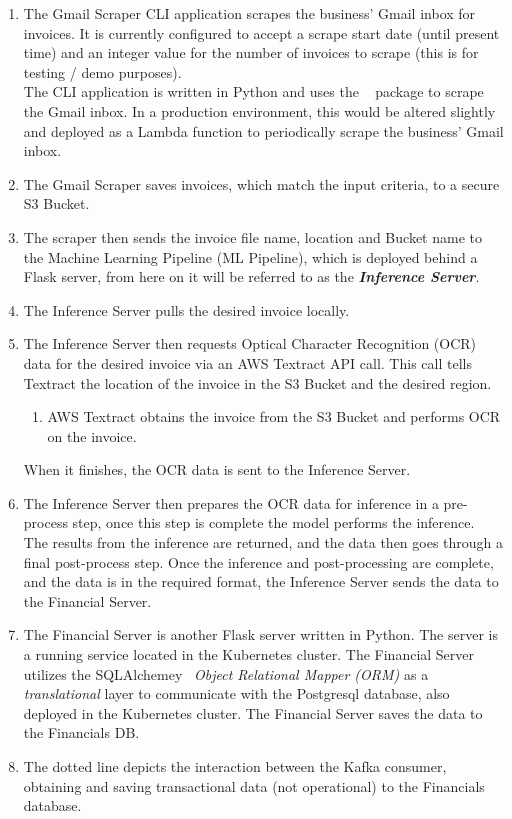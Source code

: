 \begin{enumerate} \label{enumerate:architecture}
	\item The Gmail Scraper CLI application scrapes the business' Gmail inbox for invoices.
	      It is currently configured to accept a scrape start date (until present time) and an
	      integer value for the number of invoices to scrape (this is for testing / demo purposes). \\
	      The CLI application is written in Python and uses the ~\autocite{rusevImboxPythonIMAP} package to scrape the
	      Gmail inbox.
	      \bigbreak
	      In a production environment, this would be altered slightly and deployed as a Lambda function
	      to periodically scrape the business' Gmail inbox.
	\item The Gmail Scraper saves invoices, which match the input criteria, to a secure S3 Bucket.
	\item The scraper then sends the invoice file name, location and Bucket name to the Machine Learning Pipeline (ML Pipeline),
	      which is deployed behind a Flask server, from here on it will be referred to as the \emph{\textbf{Inference Server}}.
	\item The Inference Server pulls the desired invoice locally.
	\item The Inference Server then requests Optical Character Recognition (OCR) data for the desired invoice via an AWS Textract API call.
	      This call tells Textract the location of the invoice in the S3 Bucket and the desired region.
	      \begin{enumerate}
		      \item AWS Textract obtains the invoice from the S3 Bucket and performs OCR on the invoice.
	      \end{enumerate}
	      When it finishes, the OCR data is sent to the Inference Server.
	\item The Inference Server then prepares the OCR data for inference in a pre-process step, once this step is complete the model
	      performs the inference.\\ The results from the inference are returned, and the data then goes through a final post-process step.
	      Once the inference and post-processing are complete, and the data is in the required format, the Inference Server sends the data
	      to the Financial Server.
	\item The Financial Server is another Flask server written in Python. The server is a running service located in the Kubernetes cluster.
	      The Financial Server utilizes the SQLAlchemey~\autocite{SQLAlchemyDatabaseToolkit} \emph{Object Relational Mapper (ORM)} as a
	      \emph{translational} layer to communicate with the Postgresql database, also deployed in the Kubernetes cluster.
	      The Financial Server saves the data to the Financials DB.
	\item The dotted line depicts the interaction between the Kafka consumer, obtaining and saving transactional data (not operational) to the
	      Financials database.
\end{enumerate}
